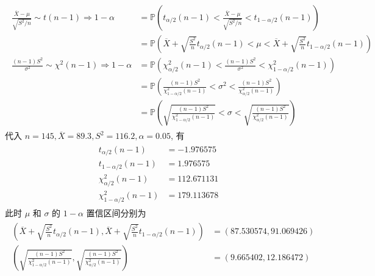 \documentclass[8pt]{article}
\theoremstyle{compact}
\def\P#1{\mathbb{P}\left({#1}\right)}
\begin{document}
\begin{align*}
	\begin{split}
		\frac{\overline{X} - \mu}{\sqrt{S^2 / n}} \sim t(n-1) \Rightarrow 1 - \alpha &= \P{t_{\alpha/2}(n-1) < \frac{\overline{X} - \mu}{\sqrt{S^2 / n}} < t_{1 - \alpha/2}(n-1)}\\
		&= \P{\overline{X} + \sqrt{\frac{S^2}{n}}t_{\alpha/2}(n-1) < \mu < \overline{X} + \sqrt{\frac{S^2}{n}}t_{1 - \alpha/2}(n-1)}\\
		\frac{(n-1)S^2}{\sigma^2} \sim \chi^2(n-1) \Rightarrow 1 - \alpha &= \P{\chi^2_{\alpha/2}(n-1) < \frac{(n-1)S^2}{\sigma^2} < \chi^2_{1 - \alpha/2}(n-1)} \\
		&= \P{\frac{(n-1)S^2}{\chi^2_{1 - \alpha/2}(n-1)} < \sigma^2 < \frac{(n-1)S^2}{\chi^2_{\alpha/2}(n-1)}} \\
		&= \P{\sqrt{\frac{(n-1)S^2}{\chi^2_{1 - \alpha/2}(n-1)}} < \sigma < \sqrt{\frac{(n-1)S^2}{\chi^2_{\alpha/2}(n-1)}}}
	\end{split}
\end{align*}
代入 $n = 145, \overline{X} = 89.3, S^2 = 116.2, \alpha = 0.05$, 有 \begin{align*}
	\begin{split}
		t_{\alpha/2}(n-1) &= -1.976575 \\
		t_{1 - \alpha/2}(n-1) &= 1.976575 \\
		\chi^2_{\alpha/2}(n-1) &= 112.671131 \\
		\chi^2_{1 - \alpha/2}(n-1) &= 179.113678
	\end{split}
\end{align*}
此时 $\mu$ 和 $\sigma$ 的 $1 - \alpha$ 置信区间分别为 \begin{align*}
	\begin{split}
		\left(\overline{X} + \sqrt{\frac{S^2}{n}}t_{\alpha/2}(n-1) , \overline{X} + \sqrt{\frac{S^2}{n}}t_{1 - \alpha/2}(n-1)\right) &= (87.530574, 91.069426) \\
		\left(\sqrt{\frac{(n-1)S^2}{\chi^2_{1 - \alpha/2}(n-1)}} , \sqrt{\frac{(n-1)S^2}{\chi^2_{\alpha/2}(n-1)}}\right) &= (9.665402, 12.186472)
	\end{split}
\end{align*}

\section{}
\end{document}
